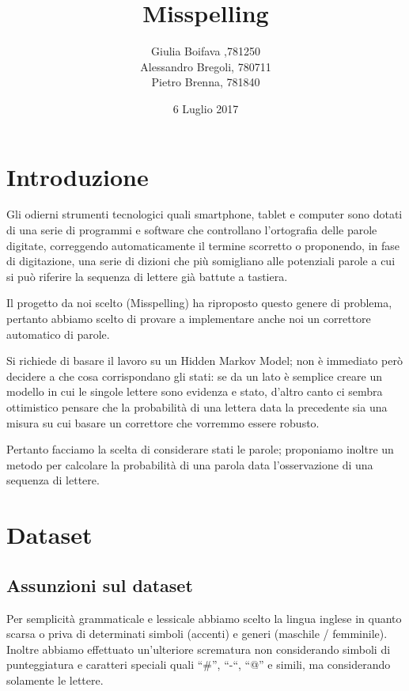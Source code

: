 \documentclass[a4paper,11pt]{article}
\title{Misspelling}
\author{Giulia Boifava ,781250\\
        Alessandro Bregoli, 780711\\
        Pietro Brenna, 781840}
\date{6 Luglio 2017}
\begin{document}
\maketitle
\newpage
\tableofcontents
\newpage

\section{Introduzione}
  Gli odierni strumenti tecnologici quali smartphone, tablet e computer sono dotati di una serie di programmi e software che controllano
  l’ortografia delle parole digitate, correggendo automaticamente il termine scorretto o proponendo, in fase di digitazione, una serie di
  dizioni che più somigliano alle potenziali parole a cui si può riferire la sequenza di lettere già battute a tastiera.
  
  Il progetto da noi scelto (Misspelling) ha riproposto questo genere di problema, pertanto abbiamo scelto di provare a implementare 
  anche noi un correttore automatico di parole.
  
  Si richiede di basare il lavoro su un Hidden Markov Model; non è immediato però decidere a che cosa corrispondano gli stati: se da un lato è 
  semplice creare un modello in cui le singole lettere sono evidenza e stato, d'altro canto ci sembra ottimistico pensare che la probabilità 
  di una lettera data la precedente sia una misura su cui basare un correttore che vorremmo essere robusto.
  
  Pertanto facciamo la scelta di considerare stati le parole; proponiamo inoltre un metodo per calcolare la probabilità di una parola data l'osservazione 
  di una sequenza di lettere.
\newpage
\section{Dataset}
  \subsection{Assunzioni sul dataset}
    Per semplicità grammaticale e lessicale abbiamo scelto la lingua inglese in quanto scarsa o priva di determinati simboli (accenti) e generi (maschile / 
    femminile).
    Inoltre abbiamo effettuato un’ulteriore scrematura non considerando simboli di punteggiatura e caratteri speciali quali “\#”, “-“, “@” e simili, ma 
    considerando solamente le lettere.
\end{document}

